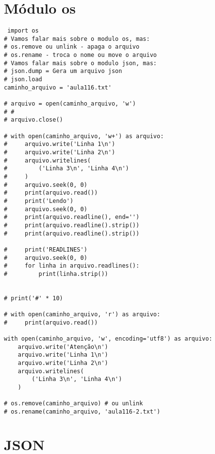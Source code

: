 \documentclass{article}
\begin{document}
\section{Módulo os}
\begin{lstlisting}
 import os
# Vamos falar mais sobre o modulo os, mas:
# os.remove ou unlink - apaga o arquivo
# os.rename - troca o nome ou move o arquivo
# Vamos falar mais sobre o modulo json, mas:
# json.dump = Gera um arquivo json
# json.load
caminho_arquivo = 'aula116.txt'

# arquivo = open(caminho_arquivo, 'w')
# #
# arquivo.close()

# with open(caminho_arquivo, 'w+') as arquivo:
#     arquivo.write('Linha 1\n')
#     arquivo.write('Linha 2\n')
#     arquivo.writelines(
#         ('Linha 3\n', 'Linha 4\n')
#     )
#     arquivo.seek(0, 0)
#     print(arquivo.read())
#     print('Lendo')
#     arquivo.seek(0, 0)
#     print(arquivo.readline(), end='')
#     print(arquivo.readline().strip())
#     print(arquivo.readline().strip())

#     print('READLINES')
#     arquivo.seek(0, 0)
#     for linha in arquivo.readlines():
#         print(linha.strip())


# print('#' * 10)

# with open(caminho_arquivo, 'r') as arquivo:
#     print(arquivo.read())

with open(caminho_arquivo, 'w', encoding='utf8') as arquivo:
    arquivo.write('Atenção\n')
    arquivo.write('Linha 1\n')
    arquivo.write('Linha 2\n')
    arquivo.writelines(
        ('Linha 3\n', 'Linha 4\n')
    )

# os.remove(caminho_arquivo) # ou unlink
# os.rename(caminho_arquivo, 'aula116-2.txt')
\end{lstlisting}
\section{JSON}
\end{document}
